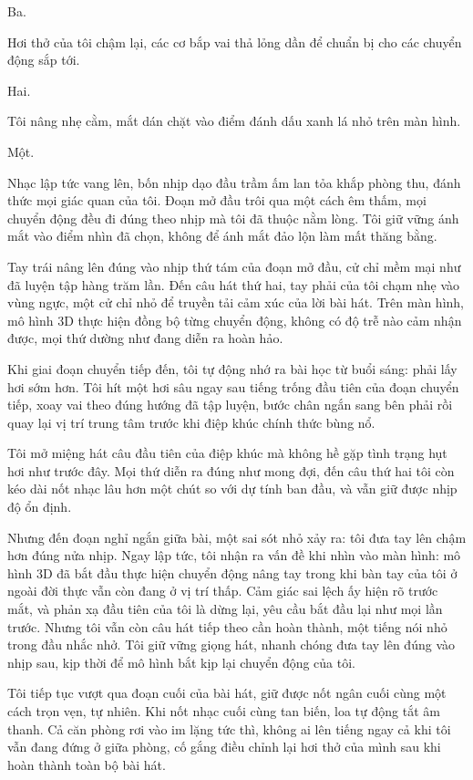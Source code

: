 ﻿\documentclass[../main.tex]{subfiles}
\begin{document}
Ba.

Hơi thở của tôi chậm lại, các cơ bắp vai thả lỏng dần để chuẩn bị cho các chuyển động sắp tới.

Hai.

Tôi nâng nhẹ cằm, mắt dán chặt vào điểm đánh dấu xanh lá nhỏ trên màn hình.

Một.

Nhạc lập tức vang lên, bốn nhịp dạo đầu trầm ấm lan tỏa khắp phòng thu, đánh thức mọi giác quan của tôi. Đoạn mở đầu trôi qua một cách êm thấm, mọi chuyển động đều đi đúng theo nhịp mà tôi đã thuộc nằm lòng. Tôi giữ vững ánh mắt vào điểm nhìn đã chọn, không để ánh mắt đảo lộn làm mất thăng bằng.

Tay trái nâng lên đúng vào nhịp thứ tám của đoạn mở đầu, cử chỉ mềm mại như đã luyện tập hàng trăm lần. Đến câu hát thứ hai, tay phải của tôi chạm nhẹ vào vùng ngực, một cử chỉ nhỏ để truyền tải cảm xúc của lời bài hát. Trên màn hình, mô hình 3D thực hiện đồng bộ từng chuyển động, không có độ trễ nào cảm nhận được, mọi thứ dường như đang diễn ra hoàn hảo.

Khi giai đoạn chuyển tiếp đến, tôi tự động nhớ ra bài học từ buổi sáng: phải lấy hơi sớm hơn. Tôi hít một hơi sâu ngay sau tiếng trống đầu tiên của đoạn chuyển tiếp, xoay vai theo đúng hướng đã tập luyện, bước chân ngắn sang bên phải rồi quay lại vị trí trung tâm trước khi điệp khúc chính thức bùng nổ.

Tôi mở miệng hát câu đầu tiên của điệp khúc mà không hề gặp tình trạng hụt hơi như trước đây. Mọi thứ diễn ra đúng như mong đợi, đến câu thứ hai tôi còn kéo dài nốt nhạc lâu hơn một chút so với dự tính ban đầu, và vẫn giữ được nhịp độ ổn định.

Nhưng đến đoạn nghỉ ngắn giữa bài, một sai sót nhỏ xảy ra: tôi đưa tay lên chậm hơn đúng nửa nhịp. Ngay lập tức, tôi nhận ra vấn đề khi nhìn vào màn hình: mô hình 3D đã bắt đầu thực hiện chuyển động nâng tay trong khi bàn tay của tôi ở ngoài đời thực vẫn còn đang ở vị trí thấp. Cảm giác sai lệch ấy hiện rõ trước mắt, và phản xạ đầu tiên của tôi là dừng lại, yêu cầu bắt đầu lại như mọi lần trước. Nhưng tôi vẫn còn câu hát tiếp theo cần hoàn thành, một tiếng nói nhỏ trong đầu nhắc nhở. Tôi giữ vững giọng hát, nhanh chóng đưa tay lên đúng vào nhịp sau, kịp thời để mô hình bắt kịp lại chuyển động của tôi.

Tôi tiếp tục vượt qua đoạn cuối của bài hát, giữ được nốt ngân cuối cùng một cách trọn vẹn, tự nhiên. Khi nốt nhạc cuối cùng tan biến, loa tự động tắt âm thanh. Cả căn phòng rơi vào im lặng tức thì, không ai lên tiếng ngay cả khi tôi vẫn đang đứng ở giữa phòng, cố gắng điều chỉnh lại hơi thở của mình sau khi hoàn thành toàn bộ bài hát.
\end{document}
